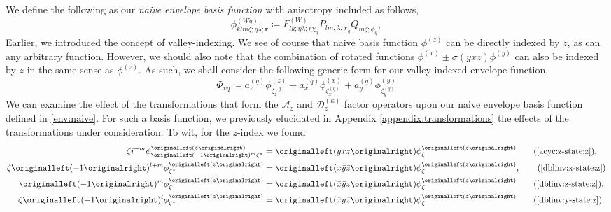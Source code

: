 We define the following as our \emph{naive envelope basis function} with
anisotropy included as follows,
\begin{equation}
\phi_{klm\zeta;\eta\lambda;\bm{r}}^{(Wq)}
  \coloneqq
    F_{lk;\eta\lambda;r\chi_{q}}^{\left(W\right)}
    P_{lm;\lambda;\chi_{q}}
    Q_{m\zeta;\phi_{q}}
,
\label{env:naive}
\end{equation}
Earlier, we introduced the concept of valley-indexing. We see of course that
naive basis function $\phi^{\left(z\right)}$ can be directly indexed by $z$, as
can any arbitrary function. However, we should also note that the combination of
rotated functions $\phi^{\left(x\right)} \pm
\sigma\left(yxz\right)\phi^{\left(y\right)}$ can also be indexed by $z$ in the
same sense as $\phi^{\left(z\right)}$. As such, we shall consider the following
generic form for our valley-indexed envelope function.
\begin{equation}
  \Phi_{\upsilon q}
  \coloneqq
  a_{z}^{\left(q\right)}
  \phi_{ \zeta_{z}^{\left(q\right)} }^{\left(z\right)}
    +
  a_{x}^{\left(q\right)}
  \phi_{ \zeta_{x}^{\left(q\right)} }^{\left(x\right)}
    +
  a_{y}^{\left(q\right)}
  \phi_{ \zeta_{y}^{\left(q\right)} }^{\left(y\right)}
\label{env:full:q}
\end{equation}  
We can examine the effect of the transformations that form the $\mathcal{A}_{z}$
and $\mathcal{D}_{z}^{\left(\kappa\right)}$ factor operators upon our naive
envelope basis function defined in \eqref{env:naive}. For such a basis function,
we previously elucidated in Appendix \ref{appendix:transformations} the effects
of the transformations under consideration. To wit, for the $z$-index we found
\begin{align}
  \zeta\im^{-m}
  \phi_{ \left(-1\right)^{m}\zeta^{*} }^{\left(z\right)}
  & =
    \left(yxz\right)
    \phi_{ \zeta }^{\left(z\right)}
\tag{\ref{acyc:z-state:z}}
,\\
\zeta\left(-1\right)^{l+m}
\phi_{ \zeta^{*} }^{\left(z\right)}
& =
    \left(x\bar{y}\bar{z}\right)
    \phi_{ \zeta }^{\left(z\right)},
\tag{\ref{dblinv:x-state:z}}
\\
  \left(-1\right)^{m}
  \phi_{ \zeta }^{ \left(z\right) }
  & =
    \left(\bar{x}\bar{y}z\right)
    \phi_{ \zeta }^{\left(z\right)}
\tag{\ref{dblinv:z-state:z}}
,\\
  \zeta\left(-1\right)^{l}
  \phi_{ \zeta^{*} }^{\left(z\right)}
  & =
    \left(\bar{x}y\bar{z}\right)
    \phi_{ \zeta }^{\left(z\right)}
\tag{\ref{dblinv:y-state:z}}
.
\end{align}
